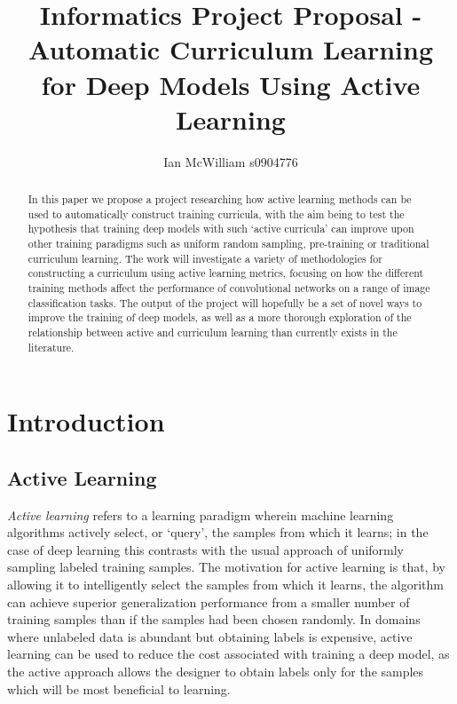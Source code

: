 \documentclass[a4paper,11pt]{article}
\begin{document}
\title{Informatics Project Proposal - Automatic Curriculum Learning for Deep Models Using Active Learning}
\author{Ian McWilliam s0904776}
\date{}
\maketitle

\begin{abstract}
In this paper we propose a project researching how active learning methods can be used to automatically construct training curricula, with the aim being to test the hypothesis that training deep models with such `active curricula' can improve upon other training paradigms such as uniform random sampling, pre-training or traditional curriculum learning. The work will investigate a variety of methodologies for constructing a curriculum using active learning metrics, focusing on how the different training methods affect the performance of convolutional networks on a range of image classification tasks. The output of the project will hopefully be a set of novel ways to improve the training of deep models, as well as a more thorough exploration of the relationship between active and curriculum learning than currently exists in the literature.
\end{abstract}

\newpage

\section{Introduction}

\subsection*{Active Learning}
\textit{Active learning} refers to a learning paradigm wherein machine learning algorithms actively select, or `query', the samples from which it learns; in the case of deep learning this contrasts with the usual approach of uniformly sampling labeled training samples. The motivation for active learning is that, by allowing it to intelligently select the samples from which it learns, the algorithm can achieve superior generalization performance from a smaller number of training samples than if the samples had been chosen randomly. In domains where unlabeled data is abundant but obtaining labels is expensive, active learning can be used to reduce the cost associated with training a deep model, as the active approach allows the designer to obtain labels only for the samples which will be most beneficial to learning.
\end{document}
